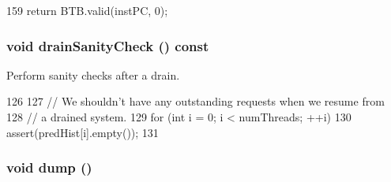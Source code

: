 \begin{DoxyCode}
159     { return BTB.valid(instPC, 0); }
\end{DoxyCode}
\hypertarget{classBPredUnit_a0240eb42fa57fe5d3788093f62b77347}{
\subsubsection[{drainSanityCheck}]{\setlength{\rightskip}{0pt plus 5cm}void drainSanityCheck () const}}
\label{classBPredUnit_a0240eb42fa57fe5d3788093f62b77347}
Perform sanity checks after a drain. 


\begin{DoxyCode}
126 {
127     // We shouldn't have any outstanding requests when we resume from
128     // a drained system.
129     for (int i = 0; i < numThreads; ++i)
130         assert(predHist[i].empty());
131 }
\end{DoxyCode}
\hypertarget{classBPredUnit_accd2600060dbaee3a3b41aed4034c63c}{
\subsubsection[{dump}]{\setlength{\rightskip}{0pt plus 5cm}void dump ()}}
\label{classBPredUnit_accd2600060dbaee3a3b41aed4034c63c}



